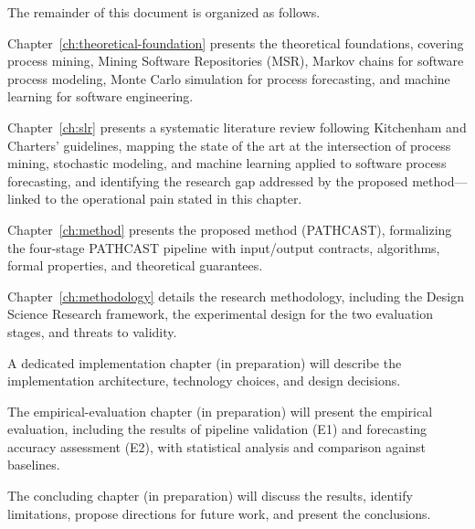 The remainder of this document is organized as follows.

Chapter~\ref{ch:theoretical-foundation} presents the theoretical
foundations, covering process mining, Mining Software Repositories (MSR),
Markov chains for software process modeling, Monte Carlo simulation for
process forecasting, and machine learning for software engineering.

Chapter~\ref{ch:slr} presents a systematic literature review following
Kitchenham and Charters' guidelines, mapping the state of the art at the
intersection of process mining, stochastic modeling, and machine learning
applied to software process forecasting, and identifying the research gap
addressed by the proposed method---linked to the operational pain stated
in this chapter.

Chapter~\ref{ch:method} presents the proposed method (PATHCAST),
formalizing the four-stage PATHCAST pipeline with input/output contracts,
algorithms, formal properties, and theoretical guarantees.

Chapter~\ref{ch:methodology} details the research methodology, including
the Design Science Research framework, the experimental design for the
two evaluation stages, and threats to validity.

A dedicated implementation chapter (in preparation) will describe the
implementation architecture, technology choices, and design decisions.

The empirical-evaluation chapter (in preparation) will present the
empirical evaluation, including the results of pipeline validation (E1)
and forecasting accuracy assessment (E2), with statistical analysis and
comparison against baselines.

The concluding chapter (in preparation) will discuss the results, identify
limitations, propose directions for future work, and present the
conclusions.
